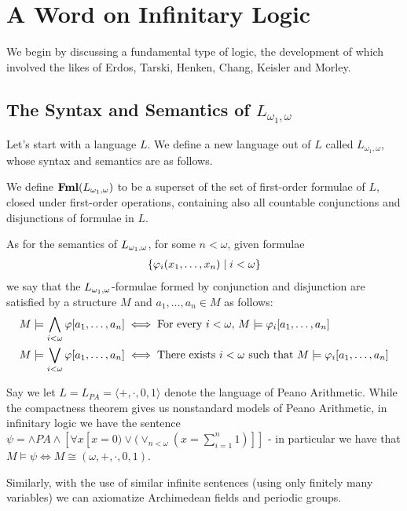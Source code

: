 \section{A Word on Infinitary Logic}

We begin by discussing a fundamental type of logic, the development of which involved the likes of Erdos, Tarski, Henken, Chang, Keisler and Morley.

\subsection{The Syntax and Semantics of $L_{\omega_1, \omega}$}

Let's start with a language $L$. We define a new language out of $L$ called $L_{\omega_1, \omega}$, whose syntax and semantics are as follows.

We define $\mathbf{Fml}\!\left( L_{\omega_1, \omega} \right)$ to be a superset of the set of first-order formulae of $L$, closed under first-order operations, containing also all countable conjunctions and disjunctions of formulae in $L$.

As for the semantics of $L_{\omega_1, \omega}$, for some $n < \omega$, given formulae
\begin{align*}
    \left\{ \varphi_{i}\!\left( x_1, \ldots, x_n \right) \; \middle\vert \; i < \omega \right\}
\end{align*}
we say that the $L_{\omega_1, \omega}$-formulae formed by conjunction and disjunction are satisfied by a structure $M$ and $a_1, \ldots, a_n \in M$ as follows:
\begin{align*}
    M \models \bigwedge_{i < \omega} \varphi\!\left[ a_1, \ldots, a_n \right] &\iff \text{For every } i < \omega \text{, } M \models \varphi_i\!\left[ a_1, \ldots, a_n \right] \\
    M \models \bigvee_{i < \omega} \varphi\!\left[ a_1, \ldots, a_n \right] &\iff \text{There exists } i < \omega \text{ such that } M \models \varphi_i\!\left[ a_1, \ldots, a_n \right]
\end{align*}

\begin{boxexample} Say we let $L=L_{PA}=\langle +, \cdot, 0, 1\rangle$ denote the language of Peano Arithmetic. While the compactness theorem gives us nonstandard models of Peano Arithmetic, in infinitary logic we have the sentence $\psi=\wedge PA \wedge [\forall x[x=0)\vee(\vee_{n<\omega}(x=\sum_{i=1}^n 1)]]$ - in particular we have that $M\models \psi \Leftrightarrow M\cong (\omega, +, \cdot, 0, 1)$.

Similarly, with the use of similar infinite sentences (using only finitely many variables) we can axiomatize Archimedean fields and periodic groups.
\end{boxexample}

